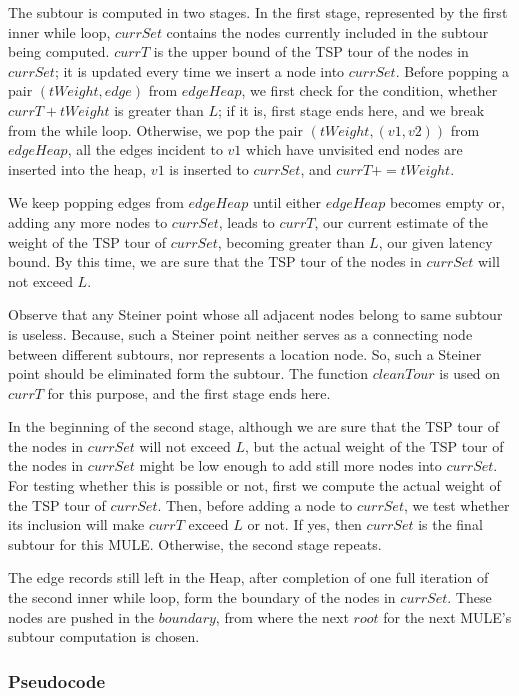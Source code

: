 The subtour is computed in two stages. In the first stage, represented by the first inner while loop, $currSet$ contains the nodes currently included in the subtour being computed. $currT$ is the upper bound of the TSP tour of the nodes in $currSet$; it is updated every time we insert a node into $currSet$. Before popping a pair $(tWeight,edge)$ from $edgeHeap$, we first check for the condition, whether $currT+tWeight$ is greater than $L$; if it is, first stage ends here, and we break from the while loop. Otherwise, we pop the pair $(tWeight,(v1,v2))$ from $edgeHeap$, all the edges incident to $v1$ which have unvisited end nodes are inserted into the heap, $v1$ is inserted to $currSet$, and $currT+=tWeight$.

We keep popping edges from $edgeHeap$ until either $edgeHeap$ becomes empty or, adding any more nodes to $currSet$, leads to $currT$, our current estimate of the weight of the TSP tour of $currSet$, becoming greater than $L$, our given latency bound.  By this time, we are sure that the TSP tour of the nodes in $currSet$ will not exceed $L$.

Observe that any Steiner point whose all adjacent nodes belong to same subtour is useless. Because, such a Steiner point neither serves as a connecting node between different subtours, nor represents a location node. So, such a Steiner point should be eliminated form the subtour. The function $cleanTour$ is used on $currT$ for this purpose, and the first stage ends here.

In the beginning of the second stage, although we are sure that the TSP tour of the nodes in $currSet$ will not exceed $L$, but the actual weight of the TSP tour of the nodes in $currSet$ might be low enough to add still more nodes into $currSet$. For testing whether this is possible or not, first we compute the actual weight of the TSP tour of $currSet$. Then, before adding a node to $currSet$, we test whether its inclusion will make $currT$ exceed $L$ or not. If yes, then $currSet$ is the final subtour for this MULE. Otherwise, the second stage repeats. %

The edge records still left in the Heap, after completion of one full iteration of the second inner while loop, form the boundary of the nodes in $currSet$. These nodes are pushed in the $boundary$, from where the next $root$ for the next MULE's subtour computation is chosen.%

\subsubsection{Pseudocode}
\label{sec:heuristicAlgo}

